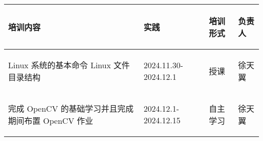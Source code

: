 
\begin{longtable}{ p{6cm} | p{3cm} | p{1.5cm} | p{4.3cm} |}

    \hline

    \endfoot
    
    \rowcolor{tabhdcolor}

        \begin{center}
            培训内容
        \end{center} &
        \begin{center}
            实践
        \end{center} &
        \begin{center}
            培训形式
        \end{center} &
        \begin{center}
            负责人
        \end{center}\\

    \hline

    \endhead

        \begin{center}
            Linux 系统的基本命令
            \newline Linux 文件目录结构
        \end{center} &
        \begin{center}
            2024.11.30-2024.12.1
        \end{center} &
        \begin{center}
            授课
        \end{center} &
        \begin{center}
            徐天翼
        \end{center}\\
        
    \hline
        \begin{center}
            完成 OpenCV 的基础学习并且完成期间布置 OpenCV 作业
        \end{center}&
        \begin{center}
            2024.12.1-2024.12.15
        \end{center}&
        \begin{center}
            自主学习
        \end{center}&
        \begin{center}
            徐天翼
        \end{center}\\
        

\end{longtable}
